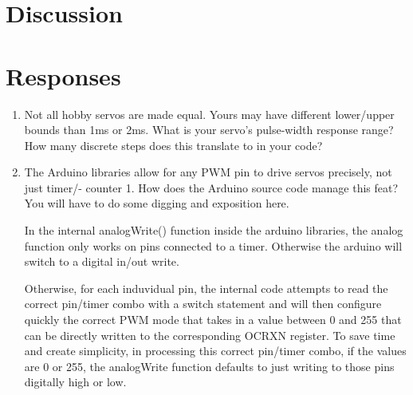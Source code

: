 \documentclass[letterpaper,11pt]{texMemo} %
\begin{document}
\section*{Discussion}


\section*{Responses}
\begin{enumerate}
\item Not all hobby servos are made equal. Yours may have different lower/upper bounds than
1ms or 2ms. What is your servo’s pulse-width response range? How many discrete steps
does this translate to in your code?



\item  The Arduino libraries allow for any PWM pin to drive servos precisely, not just timer/-
counter 1. How does the Arduino source code manage this feat? You will have to do some
digging and exposition here.

In the internal analogWrite() function inside the arduino libraries, the analog function only works 
on pins connected to a timer. Otherwise the arduino will switch to a digital in/out write.

Otherwise, for each induvidual pin, the internal code attempts to read the correct pin/timer combo 
with a switch statement and will then configure quickly the correct PWM mode that takes in a 
value between 0 and 255 that can be directly written to the corresponding OCRXN register. To save time 
and create simplicity, in processing this correct pin/timer combo, if the values are 0 or 255, 
the analogWrite function defaults to just writing to those pins digitally high or low.


\end{enumerate} 

\newpage
\end{document}
